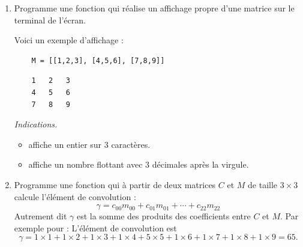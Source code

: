 \documentclass[11pt,class=report,crop=false]{standalone}
\begin{document}
\begin{activite}
	
		
\begin{enumerate}
	\item Programme une fonction  qui réalise un affichage propre d'une matrice sur le terminal de l'écran.
	

	Voici un exemple d'affichage :
	
\begin{center}
	\begin{minipage}{0.55\textwidth}
	\begin{center}
	\begin{lstlisting}
	M = [[1,2,3], [4,5,6], [7,8,9]]	
	\end{lstlisting}		
	\end{center}	
	\end{minipage}\qquad\qquad
	\begin{minipage}{0.4\textwidth}
	\begin{center}
	\begin{lstlisting}
	1   2   3 
	4   5   6 
	7   8   9	
	\end{lstlisting}
	\end{center}
	\end{minipage}
\end{center}



	\emph{Indications.}
	\begin{itemize}
		\item {} affiche un entier sur $3$ caractères.
		\item {} affiche un nombre flottant avec $3$ décimales après la virgule.
	\end{itemize}
			
	\item Programme une fonction  qui à partir de deux matrices $C$ et $M$ de taille $3\times 3$ calcule l'élément de convolution :
	$$\gamma = c_{00}m_{00} + c_{01}m_{01} + \cdots + c_{22}m_{22}$$
	Autrement dit $\gamma$ est la somme des produits des coefficients entre $C$ et $M$.
	Par exemple pour :	
	L'élément de convolution est $$\gamma = 1\times 1 + 1\times 2 + 	1\times 3 + 1\times 4 + 5 \times 5 + 1\times 6 + 1\times 7 + 	1\times 8 + 1\times 9 = 65.$$


\end{enumerate}
\end{activite}
\end{document}
